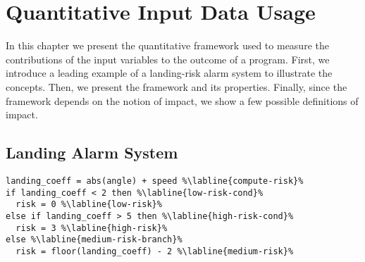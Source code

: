 %

\chapter{Quantitative Input Data Usage}

In this chapter we present the quantitative framework used to measure the contributions of the input variables to the outcome of a program. First, we introduce a leading example of a landing-risk alarm system to illustrate the concepts. Then, we present the framework and its properties. Finally, since the framework depends on the notion of impact, we show a few possible definitions of impact.

\section{Landing Alarm System}
\newcommand*{\x}{\texttt{angle}}
\newcommand*{\y}{\texttt{speed}}
\newcommand*{\z}{\texttt{risk}}
\newcommand*{\lc}{\texttt{landing\_coeff}}


\begin{lstlisting}[language=customPython,escapechar=\%,label={lst:landing-alarm-system},caption={Program for the landing-risk alarm system.}]
landing_coeff = abs(angle) + speed %\labline{compute-risk}%
if landing_coeff < 2 then %\labline{low-risk-cond}%
  risk = 0 %\labline{low-risk}%
else if landing_coeff > 5 then %\labline{high-risk-cond}%
  risk = 3 %\labline{high-risk}%
else %\labline{medium-risk-branch}%
  risk = floor(landing_coeff) - 2 %\labline{medium-risk}%
\end{lstlisting}


